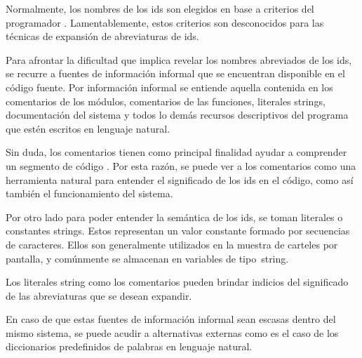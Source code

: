 \documentclass[a4paper,12pt]{report}
\begin{document}


Normalmente, los nombres de los ids son elegidos en base a criterios del programador \cite{LFBEX07, EHPV09}. Lamentablemente, estos criterios son desconocidos para las técnicas de expansión de abreviaturas de ids.


Para afrontar la dificultad que implica revelar los nombres abreviados de los ids, se recurre a fuentes de información informal que se encuentran disponible en el código fuente. Por información informal se entiende aquella contenida en los comentarios de los módulos, comentarios de las funciones, literales strings, documentación del sistema y todos lo demás recursos descriptivos del programa que estén escritos en lenguaje natural.


Sin duda, los comentarios tienen como principal finalidad ayudar a comprender un segmento de código \cite{JDPH08}. Por esta razón, se puede ver a los comentarios como una herramienta natural para entender el significado de los ids en el código, como así también el funcionamiento del sistema.

Por otro lado para poder entender la semántica de los ids, se toman li\-terales o constantes strings.
Estos representan un valor constante formado por secuencias de caracteres. Ellos son generalmente utilizados en la muestra de carteles por pantalla, y comúnmente se almacenan en variables de \mbox{tipo string.}

Los literales string como los comentarios pueden brindar indicios del significado de las abreviaturas que se desean expandir.%

En caso de que estas fuentes de información informal sean escasas dentro del mismo sistema, se puede acudir a alternativas externas como es el caso de los diccionarios predefinidos de palabras en lenguaje natural.
\end{document}
